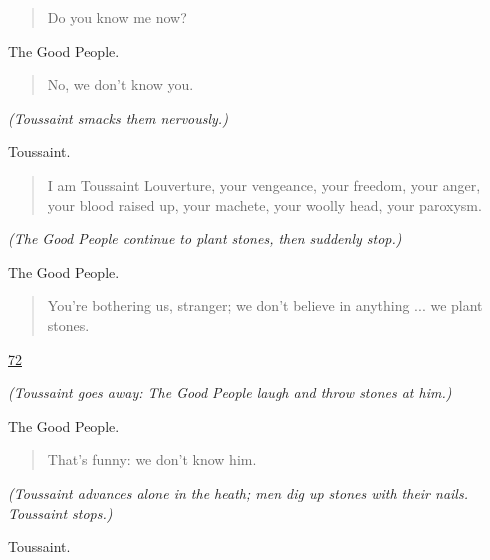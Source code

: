 \documentclass[letterpaper,article,12pt,oneside,notitlepage]{memoir}
\begin{document}
\begin{verse}
Do you know me now? \\
\end{verse}

\begin{center}The Good People.\end{center}

\begin{verse}
No, we don't know you. \\
\end{verse}

\textit{(Toussaint smacks them nervously.)}

\begin{center}Toussaint.\end{center}

\begin{verse}
I am Toussaint Louverture, your vengeance, your freedom, your anger, your blood raised up, your machete, your woolly head, your paroxysm. \\
\end{verse}

\textit{(The Good People continue to plant stones, then suddenly stop.)}

\begin{center}The Good People.\end{center}

\begin{verse}
You're bothering us, stranger; we don't believe in anything ... we plant stones. \\
\end{verse}

\clearpage

\href{http://cesaire.elotroalex.com/chiens/chiens/p072.html}{72}

\textit{(Toussaint goes away: The Good People laugh and throw stones at him.)}

\begin{center}The Good People.\end{center}

\begin{verse}
That's funny: we don't know him. \\
\end{verse}

\textit{(Toussaint advances alone in the heath; men dig up stones with their nails. Toussaint stops.)}

\begin{center}Toussaint.\end{center}
\end{document}
